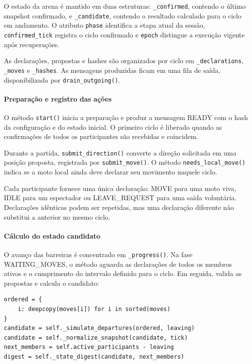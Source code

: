 \documentclass[11pt,a4paper]{article}
\begin{document}
O estado da arena é mantido em duas estruturas: \texttt{\_confirmed}, contendo o último snapshot confirmado, e \texttt{\_candidate}, contendo o resultado calculado para o ciclo em andamento. O atributo \texttt{phase} identifica a etapa atual da sessão, \texttt{confirmed\_tick} registra o ciclo confirmado e \texttt{epoch} distingue a execução vigente após recuperações.

As declarações, propostas e hashes são organizados por ciclo em \texttt{\_declarations}, \texttt{\_moves} e \texttt{\_hashes}. As mensagens produzidas ficam em uma fila de saída, disponibilizada por \texttt{drain\_outgoing()}.

\paragraph{Preparação e registro das ações}

O método \texttt{start()} inicia a preparação e produz a mensagem READY com o hash da configuração e do estado inicial. O primeiro ciclo é liberado quando as confirmações de todos os participantes são recebidas e coincidem.

Durante a partida, \texttt{submit\_direction()} converte a direção solicitada em uma posição proposta, registrada por \texttt{submit\_move()}. O método \texttt{needs\_local\_move()} indica se a moto local ainda deve declarar seu movimento naquele ciclo.

Cada participante fornece uma única declaração: MOVE para uma moto viva, IDLE para um espectador ou LEAVE\_REQUEST para uma saída voluntária. Declarações idênticas podem ser repetidas, mas uma declaração diferente não substitui a anterior no mesmo ciclo.

\paragraph{Cálculo do estado candidato}

O avanço das barreiras é concentrado em \texttt{\_progress()}. Na fase WAITING\_MOVES, o método aguarda as declarações de todos os membros ativos e o cumprimento do intervalo definido para o ciclo. Em seguida, valida as propostas e calcula o candidato:

\par\smallskip
\noindent
\begin{minipage}{\linewidth}
\begin{verbatim}
ordered = {
    i: deepcopy(moves[i]) for i in sorted(moves)
}
candidate = self._simulate_departures(ordered, leaving)
candidate = self._normalize_snapshot(candidate, tick)
next_members = self.active_participants - leaving
digest = self._state_digest(candidate, next_members)
\end{verbatim}
\end{minipage}
\par\smallskip
\end{document}
